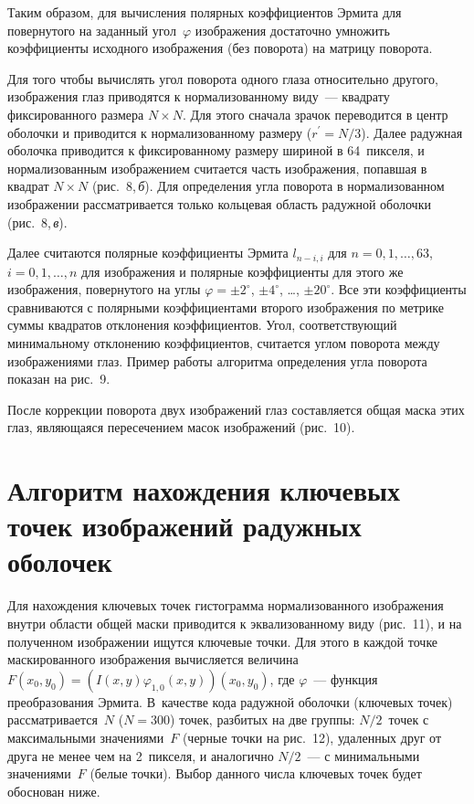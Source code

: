 \begin{multicols}{2}


Таким образом, для вычисления полярных коэффициентов Эрмита для 
повернутого на заданный угол~$\varphi$ изображения достаточно умножить 
коэффициенты исходного изображения (без поворота) на матрицу поворота.

Для того чтобы вычислять угол поворота одного глаза относительно другого, 
изображения глаз приводятся к нормализованному виду~--- квадрату 
фиксированного размера $N\times N$. Для этого сначала зрачок переводится в 
центр оболочки и приводится к нормализованному размеру ($r^\prime =N/3$). 
Далее радужная оболочка приводится к фиксированному размеру шириной в 
64~пикселя, и нормализованным изображением считается часть изображения, 
попавшая в квадрат $N\times N$ (рис.~8,\,\textit{б}). Для определения угла 
поворота в нормализованном изображении рассматривается только кольцевая 
область радужной оболочки (рис.~8,\,\textit{в}).


Далее считаются полярные коэффициенты Эрмита $l_{n-i,i}$ для $n = 0, 1, \ldots , 
63$, $i = 0, 1, \ldots , n$ для изображения и полярные коэффициенты для этого же 
изображения, повернутого на углы $\varphi=\pm2^\circ$, $\pm4^\circ$, \ldots , $\pm 
20^\circ$. Все эти коэффициенты сравниваются с полярными коэффициентами 
второго изобра\-же\-ния по метрике суммы квадратов отклонения коэффициентов. 
Угол, соответствующий минимальному отклонению коэффициентов, считается 
углом поворота между изображениями глаз.
Пример работы алгоритма 
определения угла поворота показан на рис.~9. 


После коррекции поворота двух изображений глаз составляется общая маска этих 
глаз, явля\-юща\-я\-ся пересечением масок изображений (рис.~10). 


\section{Алгоритм нахождения ключевых точек изображений радужных 
оболочек}

Для нахождения ключевых точек гистограмма нормализованного изображения 
внутри об\-ласти общей маски приводится к эквализованному виду (рис.~11), и на 
полученном изображении ищутся ключевые точки. Для этого в каждой точке 
маскированного изображения вычисляется величина $F(x_0, y_0)=(I(x,y) 
\varphi_{1,0}(x,y))(x_0,y_0)$, где $\varphi$~--- функция преобразования Эрмита. 
В~качестве кода радужной оболочки (ключевых точек) рассматривается~$N$ ($N = 
300$) точек, разбитых на две группы: $N/2$~точек с максимальными 
значениями~$F$ (черные точки на рис.~12), удаленных друг от друга не менее чем 
на 2~пикселя, и аналогично $N/2$~--- с минимальными значениями~$F$ (белые 
точки). Выбор данного числа ключевых точек будет обоснован ниже.



\end{multicols}
